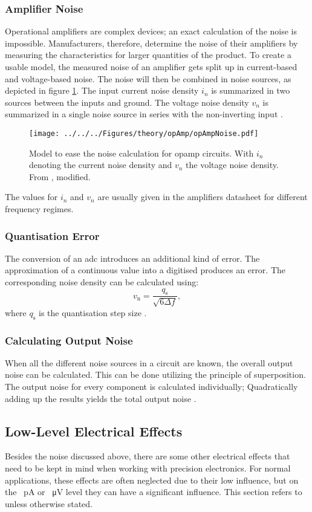 \subsubsection*{Amplifier Noise}
Operational amplifiers are complex devices; an exact calculation of the noise is impossible. Manufacturers, therefore, determine the noise of their amplifiers by measuring the characteristics for larger quantities of the product. To create a usable model, the  measured noise of an amplifier gets split up in current-based and voltage-based noise. The noise will then be combined in noise sources, as depicted in figure \ref{fig:theory:opampnoise}. 
The input current noise density $i_n$ is summarized in two sources between the inputs and ground. The voltage noise density $v_n$ is summarized in a single noise source in series with the non-inverting input \cite{ti_noise}.
\begin{figure}
	\centering
	\texttt{[image: ../../../Figures/theory/opAmp/opAmpNoise.pdf]}
	\caption{Model to ease the noise calculation for \ac{opamp} circuits. With $i_n$ denoting the current noise density and $v_n$ the voltage noise density. From \cite{ti_noise}, modified.}
	\label{fig:theory:opampnoise}
\end{figure}
The values for $i_n$ and $v_n$ are usually given in the amplifiers datasheet for different frequency regimes.
\subsubsection{Quantisation Error}
The conversion of an \ac{adc} introduces an additional kind of error. The approximation of a continuous value into a digitised produces an error. The corresponding noise density can be calculated using:
\begin{equation}
v_\text{n}=\frac{q_\text{s}}{\sqrt{6\Delta f}},
\end{equation}
where $q_\text{s}$ is the quantisation step size \cite{Plassche2012}.
\subsubsection{Calculating Output Noise}
When all the different noise sources in a circuit are known, the overall output noise can be calculated. This can be done utilizing the principle of superposition. The output noise for every component is calculated individually; Quadratically adding up the results yields the total output noise \cite{ti_noise}. 

\subsection{Low-Level Electrical Effects}
\label{sec:theory:precision}
Besides the noise discussed above, there are some other electrical effects that need to be kept in mind when working with precision electronics. For normal applications, these effects are often neglected due to their low influence, but on the \SI{}{\pico\ampere} or \SI{}{\micro\volt} level they can have a significant influence. This section refers to \cite{lowlvl} unless otherwise stated.
